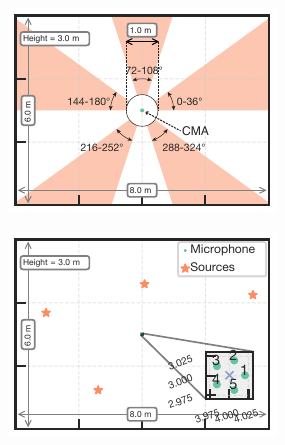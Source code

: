 \documentclass[sip,biber]{now-journal}
\begin{document}
\begin{figure}[t]
  \centering
  \begin{minipage}[t]{.32\linewidth}
    \centering
    \includegraphics[width=\columnwidth]{figures/room_layout_range.pdf}
    \label{fig:layout:range}
  \end{minipage}
  \begin{minipage}[t]{.32\linewidth}
    \centering
    \includegraphics[width=\columnwidth]{figures/room_layout_000.pdf}
    \label{fig:layout:ref}
  \end{minipage}

\end{figure}
\end{document}
